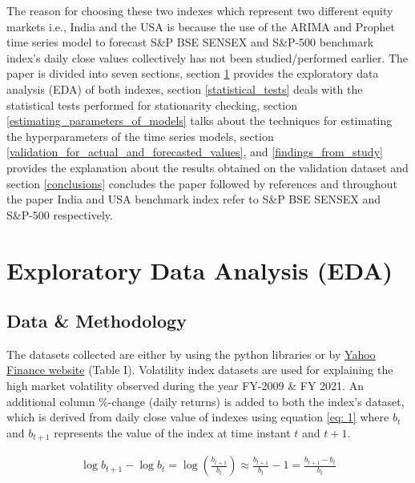 \documentclass[conference]{IEEEtran}
\begin{document}
The reason for choosing these two indexes which represent two different equity markets i.e., India and the USA is because the use of the ARIMA and Prophet time series model to forecast S\&P BSE SENSEX and S\&P-500 benchmark index's daily close values collectively has not been studied/performed earlier.
The paper is divided into seven sections, section \ref{exploratory_data_analysis} provides the exploratory data analysis (EDA) of both indexes, section \ref{statistical_tests} deals with the statistical tests performed for stationarity checking, section \ref{estimating_parameters_of_models} talks about the techniques for estimating the hyperparameters of the time series models, section \ref{validation_for_actual_and_forecasted_values}, and \ref{findings_from_study} provides the explanation about the results obtained on the validation dataset and section \ref{conclusions} concludes the paper followed by references and throughout the paper India and USA benchmark index refer to S\&P BSE SENSEX and S\&P-500 respectively.

\section{Exploratory Data Analysis (EDA)} \label{exploratory_data_analysis}
\subsection{Data \& Methodology}
The datasets collected are either by using the python libraries or by \href{https://cutt.ly/5b6Yn9L}{Yahoo Finance website} (Table I). Volatility index datasets are used for explaining the high market volatility observed during the year FY-2009 \& FY 2021. 
An additional column \%-change (daily returns) is added to both the index's dataset, which is derived from daily close value of indexes using equation \eqref{eq: 1} where $b_{t}$ and $b_{t+1}$ represents the value of the index at time instant $t$ and $t+1$.

\begin{align}
    \log b_{t+1} - \log b_{t} = \log\left(\frac{b_{t + 1}}{b_{t}} \right)  \approx \frac{b_{t+1}}{b_{t}} - 1 = \frac{b_{t + 1} - b_{t}}{b_{t}}
    \label{eq: 1}
\end{align}
\end{document}
